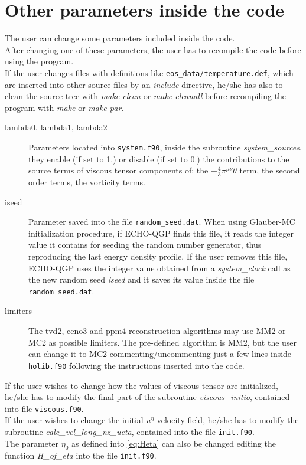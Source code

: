 \section{Other parameters inside the code}\label{extraparam}
The user can change some parameters included inside the code.\\
After changing one of these parameters, the user has to recompile the code before using the program.\\
If the user changes files with definitions like {\tt eos\_data/temperature.def}, which are inserted into other source files by an \emph{include} directive, he/she has also to clean the source tree with \emph{make clean} or \emph{make cleanall} before recompiling the program with \emph{make} or \emph{make par}.
\begin{description}

\item[lambda0, lambda1, lambda2] Parameters located into {\tt system.f90}, inside the subroutine \emph{system\_sources}, they enable (if set to 1.) or disable (if set to 0.) the contributions to the source terms of viscous tensor components of: the $-\frac{4}{3}\pi^{\mu \nu} \theta$ term, the second order terms, the vorticity terms.
\item[iseed] Parameter saved into the file {\tt random\_seed.dat}. When using Glauber-MC initialization procedure, if ECHO-QGP finds this file, it reads the integer value it contains for seeding the random number generator, thus reproducing the last energy density profile. If the user removes this file, ECHO-QGP uses the integer value obtained from a \emph{system\_clock} call as the new random seed \emph{iseed} and it saves its value inside the file {\tt random\_seed.dat}.
\item[limiters] The tvd2, ceno3 and ppm4 reconstruction algorithms may use MM2 or MC2 as possible limiters. The pre-defined algorithm is MM2, but the user can change it to MC2 commenting/uncommenting just a few lines inside {\tt holib.f90} following the instructions inserted into the code.

\end{description}
If the user wishes to change how the values of viscous tensor are initialized, he/she has to modify the final part of the subroutine \emph{viscous\_initio}, contained into file {\tt viscous.f90}.\\
If the user wishes to change the initial $u^{\eta}$ velocity field, he/she has to modify the subroutine \emph{calc\_vel\_long\_nz\_ueta}, contained into the file {\tt init.f90}.\\
The parameter $\eta_0$ as defined into \ref{eq:Heta} can also be changed editing the function \emph{H\_of\_eta} into the file {\tt init.f90}.\\

